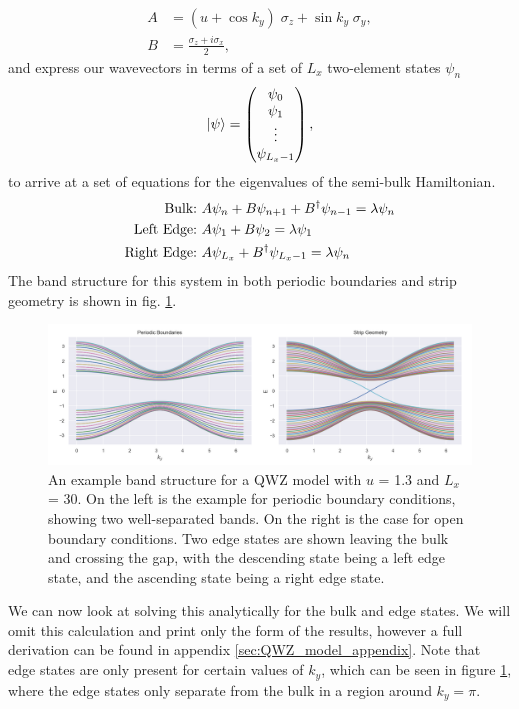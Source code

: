 \begin{align}
    A &= (u + \cos k_y) \; \sigma_z + \sin k_y \; \sigma_y,  \\ 
    B &= \frac{\sigma_z + i\sigma_x}{2},
\end{align}
and express our wavevectors in terms of a set of $L_x$ two-element states $\psi_n$
\begin{align}
    \ket{\psi} = \begin{pmatrix}
    \psi_0 \\
    \psi_1 \\
    \vdots \\
    \psi_{L_x -1}
     \end{pmatrix},
\end{align}
to arrive at a set of equations for the eigenvalues of the semi-bulk Hamiltonian.
\begin{align}
    \textup{Bulk:} &\ A\psi_n + B\psi_{n+1} + B^\dag \psi_{n-1} = \lambda \psi_n \\
    \textup{Left Edge:} &\ A\psi_1 + B\psi_{2} = \lambda \psi_1\\
    \textup{Right Edge:} &\ A\psi_{L_x} + B^\dag \psi_{L_x-1}  = \lambda \psi_n
\end{align}
The band structure for this system in both periodic boundaries and strip geometry is shown in fig. \ref{fig:strip_energy}.
\begin{figure}[t]
\begin{center}
 \includegraphics[width=.85\textwidth]{strip_energy}
\caption{An example band structure for a QWZ model with $u$ = 1.3 and $L_x$ = 30. On the left is the example for periodic boundary conditions, showing two well-separated bands. On the right is the case for open boundary conditions. Two edge states are shown leaving the bulk and crossing the gap, with the descending state being a left edge state, and the ascending state being a right edge state. }
\label{fig:strip_energy}
\end{center}
\end{figure}
We can now look at solving this analytically for the bulk and edge states. We will omit this calculation and print only the form of the results, however a full derivation can be found in appendix \ref{sec:QWZ_model_appendix}. Note that edge states are only present for certain values of $k_y$, which can be seen in figure \ref{fig:strip_energy}, where the edge states only separate from the bulk in a region around $k_y = \pi$. \par
